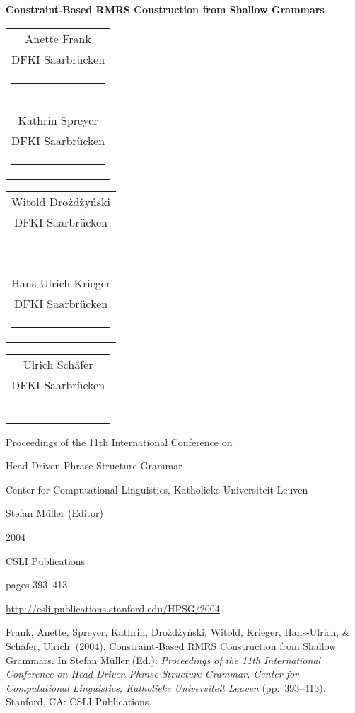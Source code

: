 \documentclass[a4paper,11pt]{article}
\begin{document}
\thispagestyle{empty}

\newcommand\formatauthor[2]{\begin{tabular}[t]{@{}c@{}}
  {\LARGE#1\strut}\\
  {\small#2\strut}\\
  \rule{\dimexpr0.5\linewidth-1em}{0pt}
  \end{tabular}\xhfill\ignorespaces}
\newcommand\xhfill{\hspace{1em plus 1fill}}

\begin{center}
  {\huge\bfseries Constraint-Based RMRS Construction from Shallow Grammars\par}

\vspace*{4ex}

\begingroup
\setlength{\leftskip}{0pt plus 1fill}
\setlength{\rightskip}{0pt plus 1fill}
\setlength{\parindent}{0pt}
\setlength{\parfillskip}{0pt}
  \formatauthor{Anette Frank}{DFKI Saarbrücken}
  \formatauthor{Kathrin Spreyer}{DFKI Saarbrücken}
  \formatauthor{Witold Drożdżyński}{DFKI Saarbrücken}
  \formatauthor{Hans-Ulrich Krieger}{DFKI Saarbrücken}
  \formatauthor{Ulrich Schäfer}{DFKI Saarbrücken}
\par\endgroup

  \vspace*{8ex}

  Proceedings of the 11th International Conference on\par Head-Driven Phrase Structure Grammar

  \bigskip

  Center for Computational Linguistics, Katholieke Universiteit Leuven

  \medskip

  Stefan Müller (Editor)

  \medskip

  2004

  \medskip

  CSLI Publications

  \medskip

  pages 393--413

  \medskip

  \url{http://csli-publications.stanford.edu/HPSG/2004}
\end{center}

\vfill
\noindent
Frank, Anette, Spreyer, Kathrin, Drożdżyński, Witold, Krieger, Hans-Ulrich, \& Schäfer, Ulrich. (2004). Constraint-Based RMRS Construction from Shallow Grammars. In Stefan Müller (Ed.): \emph{Proceedings of the 11th International Conference on Head-Driven Phrase Structure Grammar, Center for Computational Linguistics, Katholieke Universiteit Leuven} (pp.\ 393--413). Stanford, CA: CSLI Publications.

 
\end{document}
